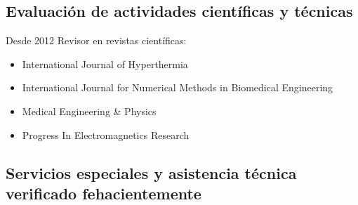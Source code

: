 \documentclass[margin,line]{res}
\begin{document}
\begin{resume}
\subsection{ Evaluación de actividades científicas y técnicas}

Desde 2012 Revisor en revistas científicas:\\
\begin{itemize}
 \item International Journal of Hyperthermia
 \item International Journal for Numerical Methods in Biomedical Engineering
 \item Medical Engineering \& Physics
 \item Progress In Electromagnetics Research
\end{itemize}


%
%
%

\subsection{ Servicios especiales y asistencia técnica verificado fehacientemente}


\end{resume}
\end{document}
